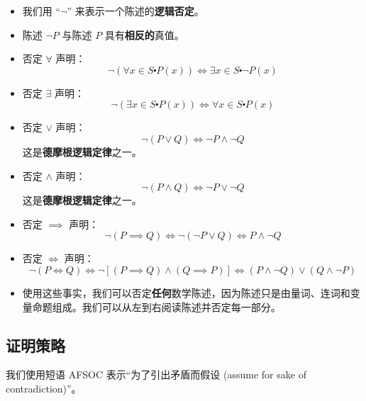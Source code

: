 \begin{itemize}
    \item 我们用 ``$\neg$'' 来表示一个陈述的\textbf{逻辑否定}。
    \item 陈述 $\neg P$ 与陈述 $P$ 具有\textbf{相反的}真值。
    \item 否定 $\forall$ 声明：
        \[\neg (\forall x \in S \centerdot P(x)) \iff \exists x \in S \centerdot \neg P(x)\]
    \item 否定 $\exists$ 声明：
        \[\neg (\exists x \in S \centerdot P(x)) \iff \forall x \in S \centerdot P(x)\]
    \item 否定 $\lor$ 声明：
        \[\neg (P \lor Q) \iff \neg P \land \neg Q\]
        这是\textbf{德摩根逻辑定律}之一。
    \item 否定 $\land$ 声明：
        \[\neg (P \land Q) \iff \neg P \lor \neg Q\]
        这是\textbf{德摩根逻辑定律}之一。
    \item 否定 $\implies$ 声明：
        \[\neg(P \implies Q) \iff \neg(\neg P \lor Q) \iff P \land \neg Q\]
    \item 否定 $\iff$ 声明：
        \[\neg (P \iff Q) \iff \neg [(P \implies Q) \land (Q \implies P)] \iff (P \land \neg Q) \lor (Q \land \neg P)\]
    \item 使用这些事实，我们可以否定\textbf{任何}数学陈述，因为陈述只是由量词、连词和变量命题组成。我们可以从左到右阅读陈述并否定每一部分。
\end{itemize}

\subsection{证明策略}

我们使用短语 AFSOC 表示``为了引出矛盾而假设 (assume for sake of contradiction)''。

